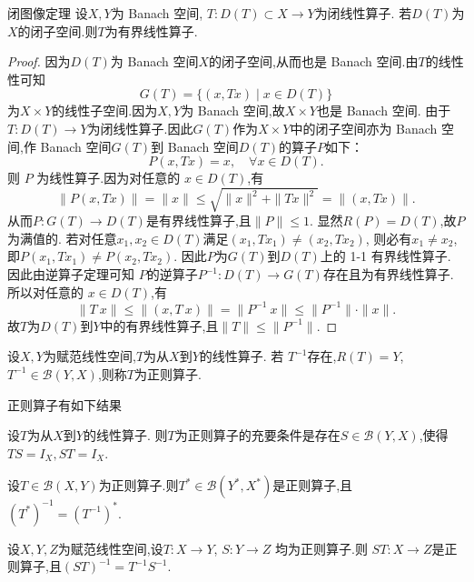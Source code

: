 \documentclass[lang=cn,18pt]{elegantbook}
\begin{document}
\begin{theorem}{闭图像定理}
    设$X,Y$为 Banach 空间, $T:D(T)\subset X\to Y$为闭线性算子. 若$D(T)$为$X$的闭子空间.则$T$为有界线性算子.
\end{theorem}
\begin{proof}
    因为$D(T)$为 Banach 空间$X$的闭子空间,从而也是 Banach 空间.由$T$的线性性可知
    $$G(T)=\{(x,Tx)\mid x\in D(T)\}$$
    为$X\times Y$的线性子空间.因为$X,Y$为 Banach 空间,故$X\times Y$也是 Banach 空间. 由于$T:D(T)\to Y$为闭线性算子.因此$G(T)$作为$X\times Y$中的闭子空间亦为 Banach 空间,作 Banach 空间$G(T)$到 Banach 空间$D(T)$的算子$P$如下：
$$P(x,Tx)=x,\quad\forall x\in D(T).$$
则 $P$ 为线性算子.因为对任意的 $x\in D(T)$,有
$$\|P(x,Tx)\|=\|x\|\leqslant\sqrt{\|x\|^2+\|Tx\|^2}=\|(x,Tx)\|.$$ 从而$P:G(T)\to D(T)$是有界线性算子,且$\|P\|\leqslant1.$ 显然$R(P)=D(T)$,故$P$为满值的.
若对任意$x_1,x_2\in D(T)$满足$(x_1,Tx_1)\neq(x_2,Tx_2)$,
则必有$x_1\neq x_2$,即$P(x_1,Tx_1)\neq P(x_2,Tx_2).$
因此$P$为$G(T)$到$D(T)$上的 1-1 有界线性算子.
因此由逆算子定理可知
$P$的逆算子$P^{-1}:D(T)\to G(T)$存在且为有界线性算子.
所以对任意的 $x\in D(T)$,有
$$\|T\:x\|\leqslant\|(x,T\:x)\|=\|P^{-1}\:x\|\leqslant\|P^{-1}\|\cdot\|x\|.$$
故$T$为$D(T)$到$Y$中的有界线性算子,且$\|T\|\leqslant\|P^{-1}\|.$
\end{proof}

\begin{definition}
     设$X,Y$为赋范线性空间,$T$为从$X$到$Y$的线性算子. 若 $T^{-1}$存在,$R( T) = Y$, $T^{- 1}\in \mathscr{B} ( Y, X) $,则称$T$为正则算子.
\end{definition}
\begin{note}
    正则算子有如下结果
\end{note}

\begin{theorem}{\textreferencemark}
    设$T$为从$X$到$Y$的线性算子. 则$T$为正则算子的充要条件是存在$S\in\mathscr{B}(Y,X)$,使得 $TS=I_X,ST=I_X.$
\end{theorem}

\begin{theorem}{\textreferencemark}
    设$T\in\mathscr{B}(X,Y)$为正则算子.则$T^*\in\mathscr{B}(Y^*,X^*)$是正则算子,且$(T^*)^{-1}=(T^{-1})^*.$
\end{theorem}
\begin{theorem}{\textreferencemark}
    设$X,Y,Z$为赋范线性空间,设$T{:}X\to Y$, $S{:}Y\to Z$ 均为正则算子.则 $ST{:}X\to Z$是正则算子,且$(ST)^{-1}=T^{-1}S^{-1}.$
\end{theorem}
\end{document}
